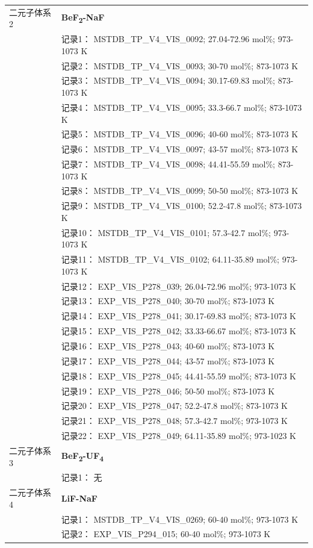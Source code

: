 \documentclass[12pt]{article}
\begin{document}
{\begin{longtable}[]{@{}
  >{\raggedright\arraybackslash}p{}
  >{\raggedright\arraybackslash}p{}@{}}
二元子体系 2  & \textbf{BeF\textsubscript{2}-NaF} \\
 & 记录1： MSTDB\_TP\_V4\_VIS\_0092; 27.04-72.96 mol\%; 973-1073 K \\
 & 记录2： MSTDB\_TP\_V4\_VIS\_0093; 30-70 mol\%; 873-1073 K \\
 & 记录3： MSTDB\_TP\_V4\_VIS\_0094; 30.17-69.83 mol\%; 873-1073 K \\
 & 记录4： MSTDB\_TP\_V4\_VIS\_0095; 33.3-66.7 mol\%; 873-1073 K \\
 & 记录5： MSTDB\_TP\_V4\_VIS\_0096; 40-60 mol\%; 873-1073 K \\
 & 记录6： MSTDB\_TP\_V4\_VIS\_0097; 43-57 mol\%; 873-1073 K \\
 & 记录7： MSTDB\_TP\_V4\_VIS\_0098; 44.41-55.59 mol\%; 873-1073 K \\
 & 记录8： MSTDB\_TP\_V4\_VIS\_0099; 50-50 mol\%; 873-1073 K \\
 & 记录9： MSTDB\_TP\_V4\_VIS\_0100; 52.2-47.8 mol\%; 873-1073 K \\
 & 记录10： MSTDB\_TP\_V4\_VIS\_0101; 57.3-42.7 mol\%; 973-1073 K \\
 & 记录11： MSTDB\_TP\_V4\_VIS\_0102; 64.11-35.89 mol\%; 973-1073 K \\
 & 记录12： EXP\_VIS\_P278\_039; 26.04-72.96 mol\%; 973-1073 K \\
 & 记录13： EXP\_VIS\_P278\_040; 30-70 mol\%; 873-1073 K \\
 & 记录14： EXP\_VIS\_P278\_041; 30.17-69.83 mol\%; 873-1073 K \\
 & 记录15： EXP\_VIS\_P278\_042; 33.33-66.67 mol\%; 873-1073 K \\
 & 记录16： EXP\_VIS\_P278\_043; 40-60 mol\%; 873-1073 K \\
 & 记录17： EXP\_VIS\_P278\_044; 43-57 mol\%; 873-1073 K \\
 & 记录18： EXP\_VIS\_P278\_045; 44.41-55.59 mol\%; 873-1073 K \\
 & 记录19： EXP\_VIS\_P278\_046; 50-50 mol\%; 873-1073 K \\
 & 记录20： EXP\_VIS\_P278\_047; 52.2-47.8 mol\%; 873-1073 K \\
 & 记录21： EXP\_VIS\_P278\_048; 57.3-42.7 mol\%; 973-1073 K \\
 & 记录22： EXP\_VIS\_P278\_049; 64.11-35.89 mol\%; 973-1023 K  \\

二元子体系 3 & \textbf{BeF\textsubscript{2}-UF\textsubscript{4}} \\
 & 记录1： 无 \\
二元子体系 4  & \textbf{LiF-NaF} \\
 & 记录1： MSTDB\_TP\_V4\_VIS\_0269; 60-40 mol\%; 973-1073 K \\
 & 记录2： EXP\_VIS\_P294\_015; 60-40 mol\%; 973-1073 K  \\


\end{longtable}}
\end{document}
